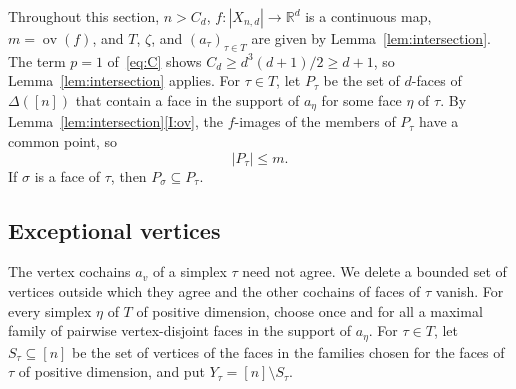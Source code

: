 \documentclass[11pt]{article}
\theoremstyle{definition}
\numberwithin{equation}{section}
\newcommand{\R}{\mathbb R}
\DeclareMathOperator{\ov}{ov}
\begin{document}
Throughout this section, $n>C_d$, $f:|X_{n,d}|\to\R^d$ is a continuous map, $m=\ov(f)$, and $T$, $\zeta$, and $(a_\tau)_{\tau\in T}$ are given by Lemma~\ref{lem:intersection}. The term $p=1$ of~\eqref{eq:C} shows $C_d\ge d^3(d+1)/2\ge d+1$, so Lemma~\ref{lem:intersection} applies. For $\tau\in T$, let $P_\tau$ be the set of $d$-faces of $\Delta([n])$ that contain a face in the support of $a_\eta$ for some face $\eta$ of $\tau$. By Lemma~\ref{lem:intersection}\ref{I:ov}, the $f$-images of the members of $P_\tau$ have a common point, so
\begin{equation}\label{eq:Pbound}
 |P_\tau|\le m.
\end{equation}
If $\sigma$ is a face of $\tau$, then $P_\sigma\subseteq P_\tau$.

\subsection{Exceptional vertices}

The vertex cochains $a_v$ of a simplex $\tau$ need not agree. We delete a bounded set of vertices outside which they agree and the other cochains of faces of $\tau$ vanish. For every simplex $\eta$ of $T$ of positive dimension, choose once and for all a maximal family of pairwise vertex-disjoint faces in the support of $a_\eta$. For $\tau\in T$, let $S_\tau\subseteq[n]$ be the set of vertices of the faces in the families chosen for the faces of $\tau$ of positive dimension, and put $Y_\tau=[n]\setminus S_\tau$.
\end{document}
